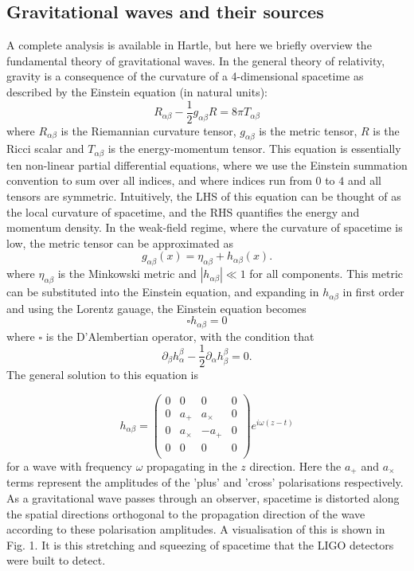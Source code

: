 \documentclass[]{article}
\begin{document}
\subsection{Gravitational waves and their sources}
A complete analysis is available in Hartle\cite{hartle}, but here we briefly overview the fundamental theory of gravitational waves. In the general theory of relativity, gravity is a consequence of the curvature of a 4-dimensional spacetime as described by the Einstein equation (in natural units):
\begin{equation}
R_{\alpha\beta}-\frac{1}{2}g_{\alpha\beta}R=8\pi T_{\alpha\beta}
\end{equation}
where $R_{\alpha\beta}$ is the Riemannian curvature tensor, $g_{\alpha\beta}$ is the metric tensor, $R$ is the Ricci scalar and $T_{\alpha\beta}$ is the energy-momentum tensor. This equation is essentially ten non-linear partial differential equations, where we use the Einstein summation convention to sum over all indices, and where indices run from $0$ to $4$ and all tensors are symmetric. Intuitively, the LHS of this equation can be thought of as the local curvature of spacetime, and the RHS quantifies the energy and momentum density. In the weak-field regime, where the curvature of spacetime is low, the metric tensor can be approximated as
\begin{equation}
g_{\alpha\beta}(x)=\eta_{\alpha\beta}+h_{\alpha\beta}(x).
\end{equation}
where $\eta_{\alpha\beta}$ is the Minkowski metric and $|h_{\alpha\beta}| \ll 1$ for all components. This metric can be substituted into the Einstein equation, and expanding in $h_{\alpha\beta}$ in first order and using the Lorentz gauage, the Einstein equation becomes
\begin{equation}
\square h_{\alpha\beta}=0
\end{equation}
where $\square$ is the D'Alembertian operator, with the condition that
\begin{equation}
\partial_\beta h^\beta_\alpha-\frac{1}{2}\partial_\alpha h^\beta_\beta=0.
\end{equation}
The general solution to this equation is

\begin{equation}
h_{\alpha\beta}=
\begin{pmatrix}
0 & 0 & 0 & 0\\
0 & a_+ & a_\times & 0\\
0 & a_\times & -a_+ & 0\\
0 & 0 & 0 & 0\\
\end{pmatrix}
e^{i\omega(z-t)}
\end{equation}
for a wave with frequency $\omega$ propagating in the $z$ direction. Here the $a_+$ and $a_\times$ terms represent the amplitudes of the 'plus' and 'cross' polarisations respectively. As a gravitational wave passes through an observer, spacetime is distorted along the spatial directions orthogonal to the propagation direction of the wave according to these polarisation amplitudes. A visualisation of this is shown in Fig. 1. It is this stretching and squeezing of spacetime that the LIGO detectors were built to detect.
\end{document}
